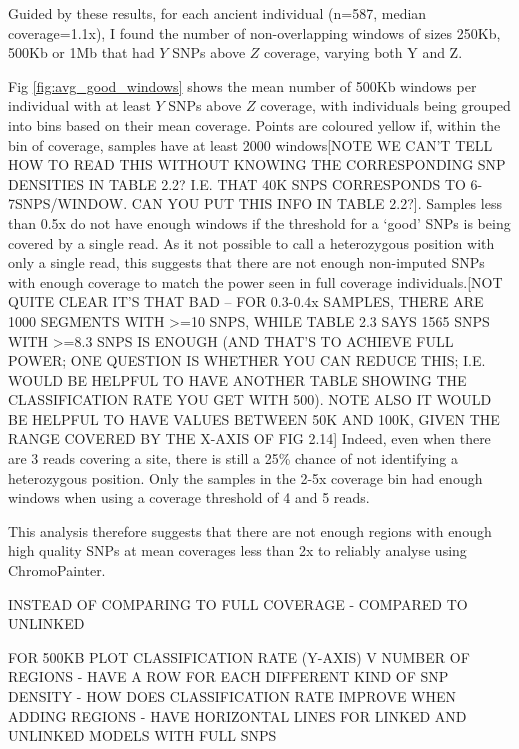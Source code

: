 Guided by these results, for each ancient individual (n=587, median coverage=1.1x), I found the number of non-overlapping windows of sizes 250Kb, 500Kb or 1Mb that had $Y$ SNPs above $Z$ coverage, varying both Y and Z. 

Fig \ref{fig:avg_good_windows} shows the mean number of 500Kb windows per individual with at least $Y$ SNPs above $Z$ coverage, with individuals being grouped into bins based on their mean coverage. Points are coloured yellow if, within the bin of coverage, samples have at least 2000 windows{\color{red}[NOTE WE CAN'T TELL HOW TO READ THIS WITHOUT KNOWING THE CORRESPONDING SNP DENSITIES IN TABLE 2.2? I.E. THAT 40K SNPS CORRESPONDS TO 6-7SNPS/WINDOW. CAN YOU PUT THIS INFO IN TABLE 2.2?]}. Samples less than 0.5x do not have enough windows if the threshold for a `good' SNPs is being covered by a single read. As it not possible to call a heterozygous position with only a single read, this suggests that there are not enough non-imputed SNPs with enough coverage to match the power seen in full coverage individuals.{\color{red}[NOT QUITE CLEAR IT'S THAT BAD -- FOR 0.3-0.4x SAMPLES, THERE ARE 1000 SEGMENTS WITH >=10 SNPS, WHILE TABLE 2.3 SAYS 1565 SNPS WITH >=8.3 SNPS IS ENOUGH (AND THAT'S TO ACHIEVE FULL POWER; ONE QUESTION IS WHETHER YOU CAN REDUCE THIS; I.E. WOULD BE HELPFUL TO HAVE ANOTHER TABLE SHOWING THE CLASSIFICATION RATE YOU GET WITH 500). NOTE ALSO IT WOULD BE HELPFUL TO HAVE VALUES BETWEEN 50K AND 100K, GIVEN THE RANGE COVERED BY THE X-AXIS OF FIG 2.14]} Indeed, even when there are 3 reads covering a site, there is still a 25\% chance of not identifying a heterozygous position. Only the samples in the 2-5x coverage bin had enough windows when using a coverage threshold of 4 and 5 reads. 

This analysis therefore suggests that there are not enough regions with enough high quality SNPs at mean coverages less than 2x to reliably analyse using ChromoPainter.

INSTEAD OF COMPARING TO FULL COVERAGE - COMPARED TO UNLINKED 

FOR 500KB PLOT CLASSIFICATION RATE (Y-AXIS) V NUMBER OF REGIONS - HAVE A ROW FOR EACH DIFFERENT KIND OF SNP DENSITY - HOW DOES CLASSIFICATION RATE IMPROVE WHEN ADDING REGIONS - HAVE HORIZONTAL LINES FOR LINKED AND UNLINKED MODELS WITH FULL SNPS 

